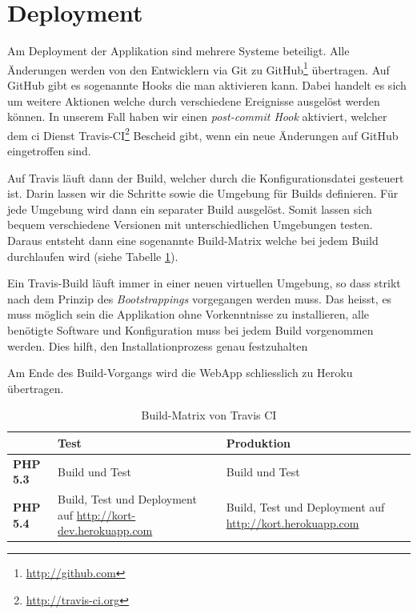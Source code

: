 \section{Deployment}
Am Deployment der Applikation sind mehrere Systeme beteiligt. 
Alle Änderungen werden von den Entwicklern via \gls{Git} zu GitHub\footnote{\url{http://github.com}} übertragen. 
Auf GitHub gibt es sogenannte Hooks die man aktivieren kann. 
Dabei handelt es sich um weitere Aktionen welche durch verschiedene Ereignisse ausgelöst werden können. 
In unserem Fall haben wir einen \emph{post-commit Hook} aktiviert, welcher dem \gls{ci} Dienst Travis-CI\footnote{\url{http://travis-ci.org}} Bescheid gibt, wenn ein neue Änderungen auf GitHub eingetroffen sind.

Auf Travis läuft dann der Build, welcher durch die Konfigurationsdatei  gesteuert ist. Darin lassen wir die Schritte sowie die Umgebung für Builds definieren. Für jede Umgebung wird dann ein separater Build ausgelöst. Somit lassen sich bequem verschiedene Versionen mit unterschiedlichen Umgebungen testen.
Daraus entsteht dann eine sogenannte Build-Matrix welche bei jedem Build durchlaufen wird (siehe Tabelle \ref{infrastruktur-build-matrix}).

Ein Travis-Build läuft immer in einer neuen virtuellen Umgebung, so dass strikt nach dem Prinzip des \emph{\gls{Bootstrapping}s} vorgegangen werden muss. Das heisst, es muss möglich sein die Applikation ohne Vorkenntnisse zu installieren, alle benötigte Software und Konfiguration muss bei jedem Build vorgenommen werden.
Dies hilft, den Installationprozess genau festzuhalten

Am Ende des Build-Vorgangs wird die \gls{WebApp} schliesslich zu Heroku übertragen. 

\begin{table}[H]
\centering
\begin{tabular}{|p{0.2\threecelltabwidth}|p{0.4\threecelltabwidth}|p{0.4\threecelltabwidth}|}
\hline 
 & \textbf{Test} & \textbf{Produktion} \\
\hline 
\textbf{PHP 5.3} & Build und Test & Build und Test \\
\hline 
\textbf{PHP 5.4} & Build, Test und Deployment auf \url{http://kort-dev.herokuapp.com} & Build, Test und Deployment auf \url{http://kort.herokuapp.com} \\
\hline 
\end{tabular} 
\caption{Build-Matrix von Travis CI}
\label{infrastruktur-build-matrix}
\end{table}

